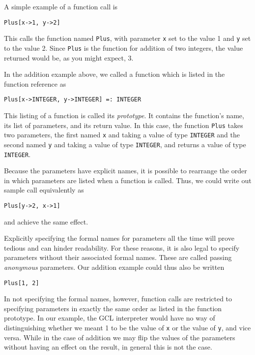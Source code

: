 A simple example of a function call is

\begin{verbatim}
Plus[x->1, y->2]
\end{verbatim}

This calls the function named {\tt Plus}, with parameter \verb+x+ set to
the value 1 and \verb+y+ set to the value 2.  Since {\tt Plus} is the function
for addition of two integers, the value returned would be, as you might
expect, 3.

In the addition example above, we called a function which is listed in
the function reference as

\begin{verbatim}
Plus[x->INTEGER, y->INTEGER] =: INTEGER
\end{verbatim}

\noindent This listing of a function is called its {\it prototype}.  
It contains the function's name, its list of parameters, and its return
value.  In this case, the function {\tt Plus} takes two parameters, the
first named \verb+x+ and taking a value of type {\tt INTEGER} and the
second named \verb+y+ and taking a value of type {\tt INTEGER}, and
returns a value of type {\tt INTEGER}.

Because the parameters have explicit names, it is possible to rearrange
the order in which parameters are listed when a function is called.
Thus, we could write out sample call equivalently as

\begin{verbatim}
Plus[y->2, x->1]
\end{verbatim}

\noindent and achieve the same effect.

Explicitly specifying the formal names for parameters all the time
will prove tedious and can hinder readability.  For these reasons, it is
also legal to specify parameters without their associated formal names.
These are called passing {\it anonymous} parameters.  Our addition
example could thus also be written

\begin{verbatim}
Plus[1, 2]
\end{verbatim}

In not specifying the formal names, however, function calls are restricted
to specifying parameters in exactly the same order as listed in the function
prototype.  In our example, the GCL interpreter would have no way of
distinguishing whether we meant 1 to be the value of \verb+x+ or the
value of \verb+y+, and vice versa.  While in the case of addition we may
flip the values of the parameters without having an effect on the result,
in general this is not the case.

